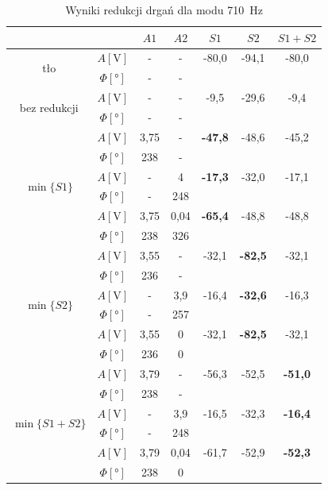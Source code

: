 \documentclass[polish,a4paper,11pt]{mwart}
\begin{document}
\begin{table}[!tbh]
  \centering
  \caption{Wyniki redukcji drgań dla modu \SI{710}{\hertz}}
  \label{tab:red4}
  \begin{tabular}{|c|c|c|c|c|c|c|}
    \cline{3-7}
    \multicolumn{2}{c|}{}&$A1$&$A2$&$S1$&$S2$&$S1+S2$\\\hline
    \multirow{2}{*}{tło}               &   $A [\si{\V}]$ & - & - & -80,0 & -94,1 & -80,0 \\\cline{2-7}
				       &$\Phi [\si{\degree}]$ & - & - & \multicolumn{3}{c}{}\\\hline
    \multirow{2}{*}{bez redukcji} &   $A [\si{\V}]$ & - & - & -9,5 & -29,6 & -9,4 \\\cline{2-7}
				       &$\Phi [\si{\degree}]$ & - & - & \multicolumn{3}{c}{}\\\hline
    \multirow{6}{*}{$\min\{S1\}$}      &   $A [\si{\V}]$ & 3,75 & - & \textbf{-47,8} & -48,6 & -45,2 \\\cline{2-7}
				       &$\Phi [\si{\degree}]$ & 238 & - & \multicolumn{3}{c}{}\\\cline{2-7}
				       &   $A [\si{\V}]$ & - & 4 & \textbf{-17,3} & -32,0 & -17,1 \\\cline{2-7}
				       &$\Phi [\si{\degree}]$ & - & 248 & \multicolumn{3}{c}{}\\\cline{2-7}
				       &   $A [\si{\V}]$ & 3,75 & 0,04 & \textbf{-65,4} & -48,8 & -48,8 \\\cline{2-7}
				       &$\Phi [\si{\degree}]$ & 238 & 326 & \multicolumn{3}{c}{}\\\hline
    \multirow{6}{*}{$\min\{S2\}$}      &   $A [\si{\V}]$ & 3,55 & - & -32,1 & \textbf{-82,5} & -32,1 \\\cline{2-7}
				       &$\Phi [\si{\degree}]$ & 236 & - & \multicolumn{3}{c}{}\\\cline{2-7}
				       &   $A [\si{\V}]$ & - & 3,9 & -16,4 & \textbf{-32,6} & -16,3 \\\cline{2-7}
				       &$\Phi [\si{\degree}]$ & - & 257 & \multicolumn{3}{c}{}\\\cline{2-7}
				       &   $A [\si{\V}]$ & 3,55 & 0 & -32,1 & \textbf{-82,5} & -32,1\\\cline{2-7}
				       &$\Phi [\si{\degree}]$ & 236 & 0 & \multicolumn{3}{c}{}\\\hline
    \multirow{6}{*}{$\min\{S1+S2\}$}   &   $A [\si{\V}]$ & 3,79 & - & -56,3 & -52,5 & \textbf{-51,0}\\\cline{2-7}
				       &$\Phi [\si{\degree}]$ & 238 & - & \multicolumn{3}{c}{}\\\cline{2-7}
				       &   $A [\si{\V}]$ & - & 3,9 & -16,5 & -32,3 & \textbf{-16,4} \\\cline{2-7}
				       &$\Phi [\si{\degree}]$ & - & 248 & \multicolumn{3}{c}{}\\\cline{2-7}
				       &   $A [\si{\V}]$ & 3,79 & 0,04 & -61,7 & -52,9 & \textbf{-52,3} \\\cline{2-7}
				       &$\Phi [\si{\degree}]$ & 238 & 0 & \multicolumn{3}{c}{}\\\cline{1-4}
  \end{tabular}
\end{table}
\end{document}
